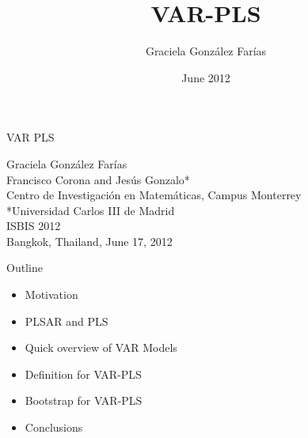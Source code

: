 \documentclass{beamer}
\title[VAR-PLS]{VAR-PLS}
\author[GGF, FCV, JG] {Graciela Gonz\'alez Far\'ias}
\institute[CIMAT MTY]{CIMAT Monterrey\\
Monterrey, NL.}
\date{June 2012}
\newcommand{\?}{?`}
\begin{document}


\begin{frame}
  \begin{center}
    \begin{block}{}
      \begin{center}
        \vspace{3mm}
        {\Large VAR PLS}
        \vspace{3mm}
      \end{center}
    \end{block}
    \vspace{5mm}
    Graciela Gonz\'alez Far\'ias \\
    \vspace{5mm}
    {\small Francisco Corona and Jes\'us Gonzalo* \\
    Centro de Investigaci\'on en Matem\'aticas,
      Campus Monterrey\\
     *Universidad Carlos III de Madrid\\
      ISBIS 2012\\
      Bangkok, Thailand, June 17, 2012}
    \vspace{5mm}
  \end{center}
\end{frame}


\begin{frame}{Outline}
  \begin{itemize}
  \item Motivation
  \item PLSAR and PLS
  \item Quick overview of VAR Models
  \item Definition for VAR-PLS
  \item Bootstrap for VAR-PLS
  \item Conclusions
  \end{itemize}
\end{frame}
\end{document}

